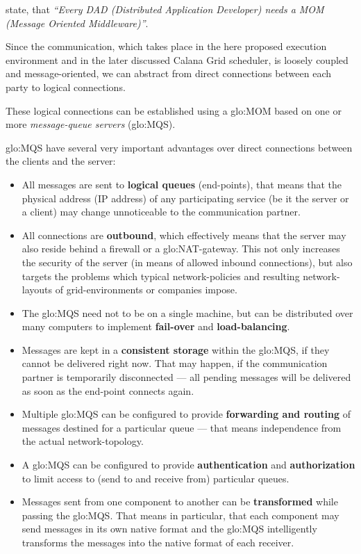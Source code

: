 \citet{dad-mom}  state, that  \emph{``Every  DAD (Distributed  Application
  Developer) needs a MOM (Message Oriented Middleware)''}.

Since the communication, which takes  place in the here proposed execution
environment and in  the later discussed Calana Grid  scheduler, is loosely
coupled  and message-oriented,  we  can abstract  from direct  connections
between each party to logical connections.

These logical  connections can be established using  a \gls{glo:MOM} based
on one or more \emph{message-queue servers} (\gls{glo:MQS}).

\gls{glo:MQS}   have  several  very   important  advantages   over  direct
connections between the clients and the server:

\begin{itemize}
\item All messages are  sent to \textbf{logical queues} (\ie end-points),
  that  means   that  the  physical  address  (\eg IP   address)  of  any
  participating  service  (be  it  the  server or  a  client)  may  change
  unnoticeable to the communication partner.
\item All connections are  \textbf{outbound}, which effectively means that
  the server may also reside behind a firewall or a \gls{glo:NAT}-gateway.
  This not only increases the security  of the server (in means of allowed
  inbound  connections),  but  also  targets the  problems  which  typical
  network-policies and  resulting network-layouts of  grid-environments or
  companies impose.
\item The  \gls{glo:MQS} need not  to be on  a single machine, but  can be
  distributed  over  many computers  to  implement \textbf{fail-over}  and
  \textbf{load-balancing}.
\item  Messages  are kept  in  a  \textbf{consistent  storage} within  the
  \gls{glo:MQS}, if they cannot be  delivered right now.  That may happen,
  if the communication partner is temporarily disconnected --- all pending
  messages will be delivered as soon as the end-point connects again.
\item    Multiple   \gls{glo:MQS}   can    be   configured    to   provide
  \textbf{forwarding and  routing} of  messages destined for  a particular
  queue --- that means independence from the actual network-topology.
\item A \gls{glo:MQS} can be configured to provide \textbf{authentication}
  and \textbf{authorization} to limit  access to (\ie send to and receive
  from) particular queues.
\item   Messages   sent   from   one   component   to   another   can   be
  \textbf{transformed}  while passing  the \gls{glo:MQS}.   That  means in
  particular,  that each  component may  send messages  in its  own native
  format and the \gls{glo:MQS}  intelligently transforms the messages into
  the native format of each receiver.
\end{itemize}



